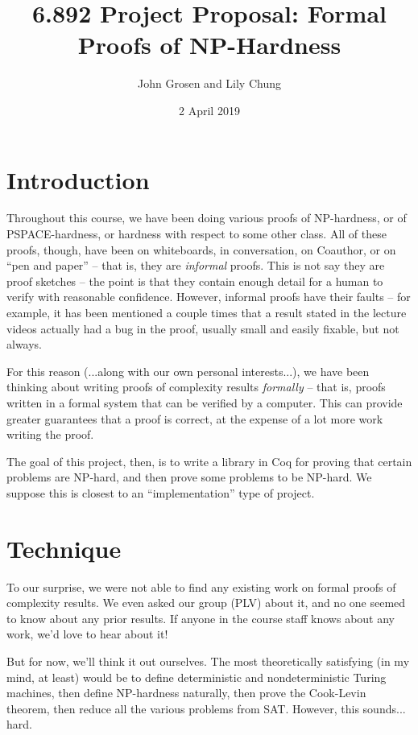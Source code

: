 \documentclass{article}
\title{6.892 Project Proposal: Formal Proofs of NP-Hardness}
\author{John Grosen and Lily Chung}
\date{2 April 2019}
\begin{document}
\maketitle

\section{Introduction}

Throughout this course, we have been doing various proofs of NP-hardness, or of
PSPACE-hardness, or hardness with respect to some other class. All of these
proofs, though, have been on whiteboards, in conversation, on Coauthor, or on
``pen and paper'' -- that is, they are \emph{informal} proofs. This is not say
they are proof sketches -- the point is that they contain enough detail for a
human to verify with reasonable confidence. However, informal proofs have their
faults -- for example, it has been mentioned a couple times that a result stated
in the lecture videos actually had a bug in the proof, usually small and easily
fixable, but not always.

For this reason (...along with our own personal interests...), we have been
thinking about writing proofs of complexity results \emph{formally} -- that is,
proofs written in a formal system that can be verified by a computer. This can
provide greater guarantees that a proof is correct, at the expense of a lot more
work writing the proof.

The goal of this project, then, is to write a library in Coq for proving that
certain problems are NP-hard, and then prove some problems to be NP-hard. We
suppose this is closest to an ``implementation'' type of project.

\section{Technique}

To our surprise, we were not able to find any existing work on formal proofs of
complexity results. We even asked our group (PLV) about it, and no one seemed to
know about any prior results. If anyone in the course staff knows about any
work, we'd love to hear about it!

But for now, we'll think it out ourselves. The most theoretically satisfying (in
my mind, at least) would be to define deterministic and nondeterministic Turing
machines, then define NP-hardness naturally, then prove the Cook-Levin theorem,
then reduce all the various problems from SAT. However, this sounds... hard.
\end{document}
